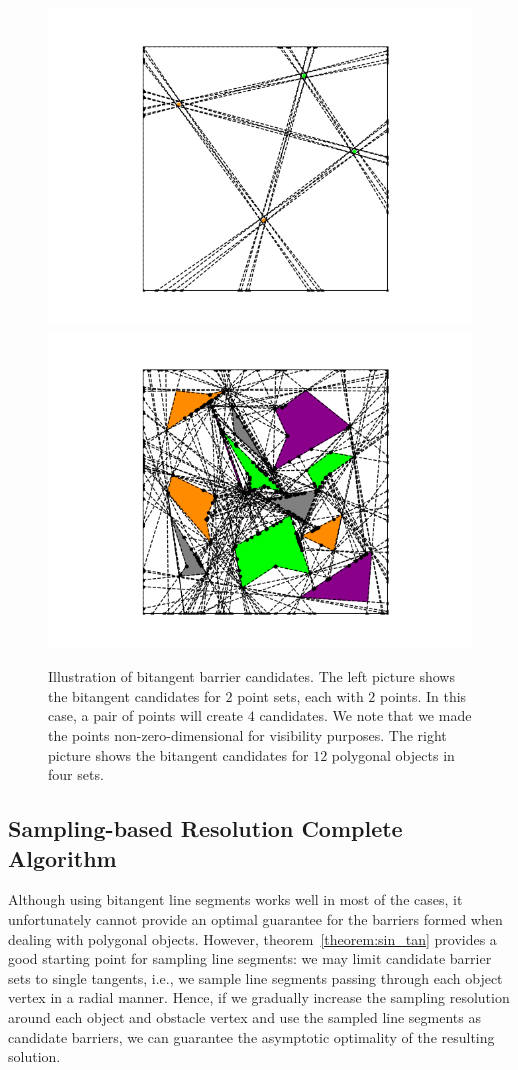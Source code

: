 \begin{figure}[ht]
    \centering
    \includegraphics[trim=80 20 80 20,clip, width = .24\textwidth]{chapters/bc/fig/candidate_1.png}
    \hspace{-.1in}
    \includegraphics[trim=80 20 80 20,clip, width = .24\textwidth]{chapters/bc/fig/candidate_2.png}
    \caption{Illustration of bitangent barrier candidates. The left picture shows the bitangent
    candidates for $2$ point sets, each with $2$ points. In this case, a pair of points will create $4$ candidates. We note that we made the points non-zero-dimensional for visibility purposes. The right picture shows the bitangent candidates for $12$ polygonal objects in four sets.}
    \label{fig:barrier_candidates}
\end{figure}

\subsection{Sampling-based Resolution Complete Algorithm}
Although using bitangent line segments works well in most of the cases, it unfortunately cannot provide an optimal guarantee for the barriers formed when dealing with polygonal objects.
However, theorem~\ref{theorem:sin_tan} provides a good starting point for sampling line segments: we may limit candidate barrier sets to single tangents, i.e., we sample line segments passing through each object vertex in a radial manner. Hence, if we gradually increase the sampling resolution around each object and obstacle vertex and use the sampled line segments as candidate barriers, we can guarantee the asymptotic optimality of the resulting solution.


